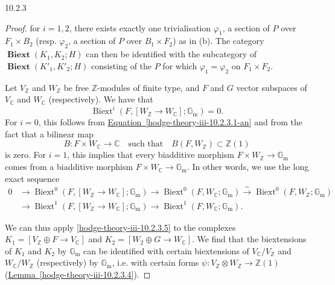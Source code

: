 \begin{construction}{10.2.3}
\begin{proof}
        for \(i=1,2\), there exists exactly one trivialisation \(\varphi _1\), a section of \(P\) over \(F_1\times  B_2\) (resp. \(\varphi _2\), a section of \(P\) over \(B_1\times  F_2\)) as in (b).
        The category \(\operatorname {\textbf {Biext}}(K_1,K_2;H)\) can then be identified with the subcategory of \(\operatorname {\textbf {Biext}}(K'_1,K'_2;H)\) consisting of the \(P\) for which \(\varphi _1=\varphi _2\) on \(F_1\times  F_2\).\label{hodge-theory-iii-10.2.3.6}\par{}Let \(V_\mathbb {Z}\) and \(W_\mathbb {Z}\) be free \(\mathbb {Z}\)-modules of finite type, and \(F\) and \(G\) vector subspaces of \(V_\mathbb {C}\) and \(W_\mathbb {C}\) (respectively).
        We have that
        \[           \operatorname {Biext}^i(F,[W_\mathbb {Z}\to  W_\mathbb {C}];\mathbb {G}_\mathrm {m})           = 0.         \]
        For \(i=0\), this follows from \hyperref[hodge-theory-iii-10.2.3.1-an]{Equation~\ref*{hodge-theory-iii-10.2.3.1-an}} and from the fact that a bilinear map
        \[           B\colon  F\times  W_\mathbb {C}\to \mathbb {C}           \quad \text {such that}\quad            B(F,W_\mathbb {Z})\subset \mathbb {Z}(1)         \]
        is zero.
        For \(i=1\), this implies that every biadditive morphism \(F\times  W_\mathbb {Z}\to \mathbb {G}_\mathrm {m}\) comes from a biadditive morphism \(F\times  W_\mathbb {C}\to \mathbb {G}_\mathrm {m}\).
        In other words, we use the long exact sequence
        \[           \begin {aligned}             0             &\to  \operatorname {Biext}^0(F,[W_\mathbb {Z}\to  W_\mathbb {C}];\mathbb {G}_\mathrm {m})             \to  \operatorname {Biext}^0(F,W_\mathbb {C};\mathbb {G}_\mathrm {m})             \xrightarrow {\sim } \operatorname {Biext}^0(F,W_\mathbb {Z};\mathbb {G}_\mathrm {m})           \\&\to  \operatorname {Biext}^1(F,[W_\mathbb {Z}\to  W_\mathbb {C}];\mathbb {G}_\mathrm {m})             \to  \operatorname {Biext}^1(F,W_\mathbb {C};\mathbb {G}_\mathrm {m}).           \end {aligned}         \]\par{}We can thus apply \cref{hodge-theory-iii-10.2.3.5} to the complexes \(K_1=[V_\mathbb {Z}\oplus  F\to  V_\mathbb {C}]\) and \(K_2=[W_2\oplus  G\to  W_\mathbb {C}]\).
        We find that the biextensions of \(K_1\) and \(K_2\) by \(\mathbb {G}_\mathrm {m}\) can be identified with certain biextensions of \(V_\mathbb {C}{/}V_\mathbb {Z}\) and \(W_\mathbb {C}{/}W_\mathbb {Z}\) (respectively) by \(\mathbb {G}_\mathrm {m}\), i.e. with certain forms \(\psi \colon  V_\mathbb {Z}\otimes  W_\mathbb {Z}\to  \mathbb {Z}(1)\) (\hyperref[hodge-theory-iii-10.2.3.4]{Lemma~\ref*{hodge-theory-iii-10.2.3.4}}).

\end{proof}
\end{construction}
